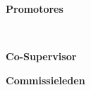 \thispagestyle{empty}
\noindent \textbf{Promotores} \par
\noindent \coadvisorOne \\ 
\noindent \coadvisorTwo \par

\bigbreak

\noindent \textbf{Co-Supervisor} \par
\noindent \coadvisorThree \par


\bigbreak

\noindent \textbf{Commissieleden} \par
\noindent \committeeOne \\ 
\noindent \committeeTwo \\ 
\noindent \committeeThree \\ 
\noindent \committeeFour \\ 
\noindent \clearpage
